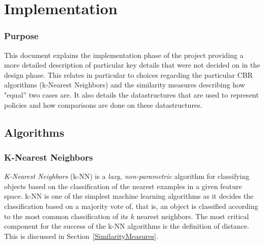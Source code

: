  
 

\chapter{Implementation}\label{impl}

\minitoc

\subsection*{Purpose}
This document explains the implementation phase of the project providing a more detailed description of particular key
details that were not decided on in the design phase. This relates in particular to choices regarding the particular CBR algorithms
(k-Nearest Neighbors) and the similarity measures describing how "equal'' two cases are. It also details the datastructures that
are used to represent policies and how comparisons are done on these datastructures.

\section{Algorithms}

\subsection{K-Nearest Neighbors}\label{kNN}

\emph{K-Nearest Neighbors} (k-NN) is a \emph{lazy, non-parametric} algorithm for classifying objects based on the classification of the nearest examples in a given feature space. k-NN is one of the simplest machine learning algorithms as it decides the classification based on a majority vote of, that is, an object is classified according to the most common classification of its $k$ nearest neighbors. The most critical component for the success of the k-NN algorithms is the definition of distance. This is discussed in Section~\ref{SimilarityMeasures}. 

